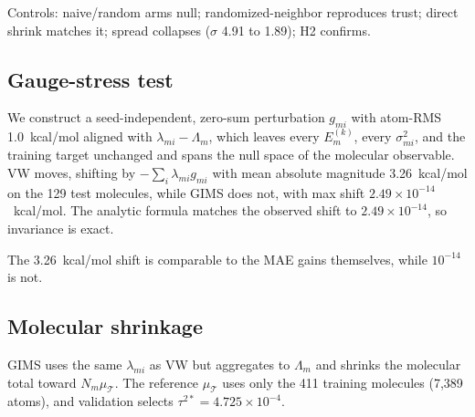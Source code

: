 \documentclass{article}
\begin{document}
Controls: naive/random arms null; randomized-neighbor reproduces trust; direct shrink matches it; spread collapses ($\sigma$ 4.91 to 1.89); H2 confirms.

\subsection{Gauge-stress test}

We construct a seed-independent, zero-sum perturbation $g_{mi}$ with atom-RMS
1.0~kcal/mol aligned with $\lambda_{mi}-\Lambda_m$, which leaves every
$E_m^{(k)}$, every $\sigma_{mi}^2$, and the training target unchanged and
spans the null space of the molecular observable. VW moves, shifting by
$-\sum_i\lambda_{mi}g_{mi}$ with mean absolute magnitude 3.26~kcal/mol on
the 129 test molecules, while GIMS does not, with max shift
$2.49\times10^{-14}$~kcal/mol. The analytic formula matches the observed shift to $2.49\times10^{-14}$, so
invariance is exact.

The 3.26~kcal/mol shift is comparable to the MAE gains themselves, while
$10^{-14}$ is not.

\subsection{Molecular shrinkage}

GIMS uses the same $\lambda_{mi}$ as VW but aggregates to $\Lambda_m$ and
shrinks the molecular total toward $N_m\mu_{\mathcal T}$. The reference
$\mu_{\mathcal T}$ uses only the 411 training molecules (7{,}389 atoms), and
validation selects $\tau^{2*}=4.725\times10^{-4}$.
\end{document}
